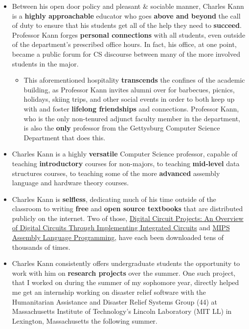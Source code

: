 \documentclass[11pt]{article}
\begin{document}
\begin{itemize}
	\item Between his open door policy and pleasant \& sociable manner, Charles Kann is a \textbf{highly approachable} educator who goes \textbf{above and beyond} the call of duty to ensure that his students get all of the help they need to \textbf{succeed}. Professor Kann forges \textbf{personal connections} with all students, even outside of the department's prescribed office hours. In fact, his office, at one point, became a public forum for CS discourse between many of the more involved students in the major.
	
\begin{itemize}
	\item This aforementioned hospitality \textbf{transcends} the confines of the academic building, as Professor Kann invites alumni over for barbecues, picnics, holidays, skiing trips, and other social events in order to both keep up with and foster \textbf{lifelong friendships} and connections. Professor Kann, who is the only non-tenured adjunct faculty member in the department, is also the \textbf{only} professor from the Gettysburg Computer Science Department that does this.
\end{itemize}

	\item Charles Kann is a highly \textbf{versatile} Computer Science professor, capable of teaching \textbf{introductory} courses for non-majors, to teaching \textbf{mid-level} data structures courses, to teaching some of the more \textbf{advanced} assembly language and hardware theory courses. 

	\item Charles Kann is \textbf{selfless}, dedicating much of his time outside of the classroom to writing \textbf{free} and \textbf{open source textbooks} that are distributed publicly on the internet. Two of those, \href{https://cupola.gettysburg.edu/cgi/viewcontent.cgi?article=1000\&context=oer}{Digital Circuit Projects: An Overview of Digital Circuits Through Implementing Integrated Circuits} and \href{https://cupola.gettysburg.edu/cgi/viewcontent.cgi?article=1001\&context=oer}{MIPS Assembly Language Programming}, have each been downloaded tens of thousands of times.

	\item Charles Kann consistently offers undergraduate students the opportunity to work with him on \textbf{research projects} over the summer. One such project, that I worked on during the summer of my sophomore year, directly helped me get an internship working on disaster relief software with the Humanitarian Assistance and Disaster Relief Systems Group (44) at Massachusetts Institute of Technology's Lincoln Laboratory (MIT LL) in Lexington, Massachusetts the following summer.
	
\end{itemize}
\end{document}
